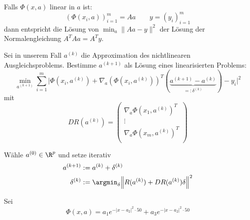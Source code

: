 \documentclass[11pt]{scrbook}
\begin{document}
Falls $\Phi(x,a)$ linear in $a$ ist:
\[
	(\Phi(x_i, a))_{i=1}^m = A a
	\qquad y = (y_i)_{i=1}^m
\]
dann entspricht die Lösung von $\min_{a} \| Aa - y\|^2$ der Lösung der Normalengleichung $A^TA a = A^T y$.

Sei in unserem Fall $a^{(k)}$ die Approximation des nichtlinearen Ausgleichsproblems.
Bestimme $a^{(k+1)}$ als Lösung eines linearisierten Problems:
\[
	\min_{a^{(k+1)}} \sum_{i=1}^m \Big| \Phi(x_i, a^{(k)}) + \nabla_a(\Phi(x_i, a^{(k)}))^T (\underbrace{a^{(k+1)} - a^{(k)}}_{=: \delta^{(k)}}) - y_i \Big|^2
\]
mit
\[
	DR (a^{(k)}) = \begin{pmatrix}
		\nabla_a \Phi(x_1, a^{(k)})^T \\
		\vdots \\
		\nabla_a \Phi(x_m, a^{(k)})^T \\
	\end{pmatrix}
\]

\begin{df} \label{4.27}
	Wähle $a^{(0)} \in \R^p$ und setze iterativ
	\begin{align*}
		a^{(k+1)} &:= a^{(k)} + \delta^{(k)} \\
		\delta^{(k)} &:=  \argmin_{\delta} \Big\| R(a^{(k)}) + DR(a^{(k)}) \delta \Big\|^2
	\end{align*}
\end{df}

\begin{ex*}
	Sei
	\[
		\Phi(x, a) = a_1 e^{-|x - a_2|^2 \cdot 50} + a_3 e^{-|x-a_2|^2 \cdot 50}
	\]
\end{ex*}
\end{document}
